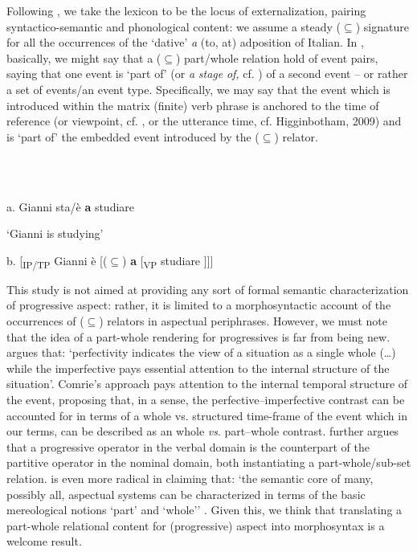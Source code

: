 \documentclass[output=paper]{langsci/langscibook}
\begin{document}
Following \citet{BerwickChomsky2011}, we take the lexicon to be the locus of externalization, pairing syntactico-semantic and phonological content: we assume a steady (${\subseteq}$) signature for all the occurrences of the ‘dative’ \textit{a} (to, at) adposition of Italian. In , basically, we might say that a (${\subseteq}$) part/whole relation hold of event pairs, saying that one event is ‘part of’ (or \textit{a} \textit{stage} \textit{of,} cf. \citealt{Landman1992}) of a second event – or rather a set of events/an event type. Specifically, we may say that the event which is introduced within the matrix (finite) verb phrase is anchored to the time of reference (or viewpoint, cf. \citealt{Comrie1976}, or the utterance time, cf. Higginbotham, 2009) and is ‘part of’ the embedded event introduced by the (${\subseteq}$) relator. 

\ea%
    \label{ex:key:8}
    \gll\\
        \\
    \glt
    \z

           a.  Gianni sta/è \textbf{a} studiare

‘Gianni is studying’

b.  [\textsubscript{IP/TP} Gianni è [(${\subseteq}$) \textbf{a} [\textsubscript{VP} studiare ]]]

This study is not aimed at providing any sort of formal semantic characterization of progressive aspect: rather, it is limited to a morphosyntactic account of the occurrences of (${\subseteq}$) relators in aspectual periphrases. However, we must note that the idea of a part-whole rendering for progressives is far from being new. \citet[16]{Comrie1976} argues that: ‘perfectivity indicates the view of a situation as a single whole (…) while the imperfective pays essential attention to the internal structure of the situation’. Comrie’s approach pays attention to the internal temporal structure of the event, proposing that, in a sense, the perfective–imperfective contrast can be accounted for in terms of a  whole vs. structured time-frame of the event which in our terms, can be described as an whole \textit{vs}. part–whole contrast. \citet{Bach1986} further argues that a progressive operator in the verbal domain is the counterpart of the partitive operator in the nominal domain, both instantiating a part-whole/sub-set relation. \citet{Filip1999} is even more radical in claiming that: ‘the semantic core of many, possibly all, aspectual systems can be characterized in terms of the basic mereological notions ‘part’ and ‘whole’’ \citep[158]{Filip1999}. Given this, we think that translating a part-whole relational content for (progressive) aspect into morphosyntax is a welcome result.  
\end{document}
